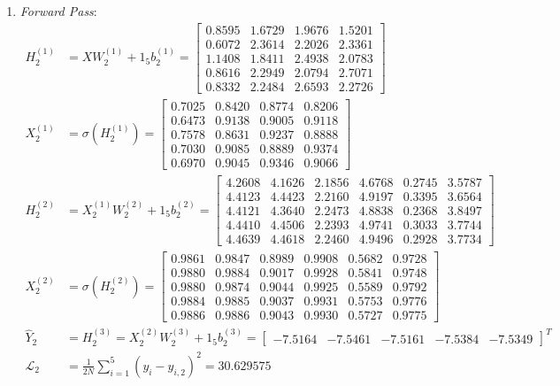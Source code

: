 \documentclass[11pt,a4paper]{article}
\def\mathbf#1{#1}%
\theoremstyle{plain}
\theoremstyle{definition}
\theoremstyle{remark}
\begin{document}
\begin{enumerate}
    \item \textit{Forward Pass}:
    \begin{align}
        H^{(1)}_2 &= X W^{(1)}_2 + \mathbf{1}_5 \mathbf{b}^{(1)}_2 = \begin{bmatrix}
            0.8595 & 1.6729 & 1.9676 & 1.5201 \\
            0.6072 & 2.3614 & 2.2026 & 2.3361 \\
            1.1408 & 1.8411 & 2.4938 & 2.0783 \\
            0.8616 & 2.2949 & 2.0794 & 2.7071 \\
            0.8332 & 2.2484 & 2.6593 & 2.2726
        \end{bmatrix} \\[0.2em]
        X^{(1)}_2 &= \sigma\!\left(H^{(1)}_2\right) = \begin{bmatrix}
            0.7025 & 0.8420 & 0.8774 & 0.8206 \\
            0.6473 & 0.9138 & 0.9005 & 0.9118 \\
            0.7578 & 0.8631 & 0.9237 & 0.8888 \\
            0.7030 & 0.9085 & 0.8889 & 0.9374 \\
            0.6970 & 0.9045 & 0.9346 & 0.9066
        \end{bmatrix} \\[0.2em]
        H^{(2)}_2 &= X^{(1)}_2 W^{(2)}_2 + \mathbf{1}_5 \mathbf{b}^{(2)}_2 = \begin{bmatrix}
            4.2608 & 4.1626 & 2.1856 & 4.6768 & 0.2745 & 3.5787 \\
            4.4123 & 4.4423 & 2.2160 & 4.9197 & 0.3395 & 3.6564 \\
            4.4121 & 4.3640 & 2.2473 & 4.8838 & 0.2368 & 3.8497 \\
            4.4410 & 4.4506 & 2.2393 & 4.9741 & 0.3033 & 3.7744 \\
            4.4639 & 4.4618 & 2.2460 & 4.9496 & 0.2928 & 3.7734
        \end{bmatrix} \\[0.2em]
        X^{(2)}_2 &= \sigma\!\left(H^{(2)}_2\right) = \begin{bmatrix}
            0.9861 & 0.9847 & 0.8989 & 0.9908 & 0.5682 & 0.9728 \\
            0.9880 & 0.9884 & 0.9017 & 0.9928 & 0.5841 & 0.9748 \\
            0.9880 & 0.9874 & 0.9044 & 0.9925 & 0.5589 & 0.9792 \\
            0.9884 & 0.9885 & 0.9037 & 0.9931 & 0.5753 & 0.9776 \\
            0.9886 & 0.9886 & 0.9043 & 0.9930 & 0.5727 & 0.9775
        \end{bmatrix} \\[0.2em]
        \hat{Y}_2 &= H^{(3)}_2 = X^{(2)}_2 W^{(3)}_2 + \mathbf{1}_5 \mathbf{b}^{(3)}_2 = \begin{bmatrix} -7.5164 & -7.5461 & -7.5161 & -7.5384 & -7.5349 \end{bmatrix}^T \\[0.2em]
        \mathcal{L}_2 &= \frac{1}{2N} \sum_{i=1}^5 \left( y_i - \hat{y}_{i, 2} \right)^2 = 30.629575
    \end{align}


\end{enumerate}
\end{document}

